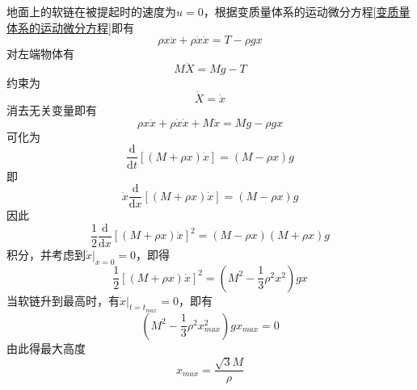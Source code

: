 \begin{solution}
地面上的软链在被提起时的速度为$u =0$，根据变质量体系的运动微分方程\eqref{变质量体系的运动微分方程}即有
\begin{equation*}
	\rho x \ddot{x} + \rho \dot{x} \dot{x} = T - \rho gx
\end{equation*}
对左端物体有
\begin{equation*}
	M\ddot{X} = Mg - T
\end{equation*}
约束为
\begin{equation*}
	\dot{X} = \dot{x}
\end{equation*}
消去无关变量即有
\begin{equation*}
	\rho x \ddot{x} + \rho \dot{x} \dot{x} + M\ddot{x} = Mg - \rho g x
\end{equation*}
可化为
\begin{equation*}
	\frac{\mathrm{d}}{\mathrm{d} t} [(M+\rho x) \dot{x}] = (M-\rho x) g
\end{equation*}
即
\begin{equation*}
	\dot{x} \frac{\mathrm{d}}{\mathrm{d} x} [(M+\rho x) \dot{x}] = (M-\rho x) g
\end{equation*}
因此
\begin{equation*}
	\frac12 \frac{\mathrm{d}}{\mathrm{d} x} [(M+\rho x) \dot{x}]^2 = (M-\rho x)(M+\rho x) g
\end{equation*}
积分，并考虑到$\dot{x}\big|_{x=0} = 0$，即得
\begin{equation*}
	\frac12 \left[(M+\rho x)\dot{x}\right]^2 = \left(M^2 - \frac13 \rho^2 x^2\right) gx
\end{equation*}
当软链升到最高时，有$\dot{x}\big|_{t=t_{max}} = 0$，即有
\begin{equation*}
	\left(M^2 - \frac13 \rho^2 x^2_{max}\right) gx_{max} = 0
\end{equation*}
由此得最大高度
\begin{equation*}
	x_{max} = \frac{\sqrt{3}M}{\rho}
\end{equation*}
\end{solution}
